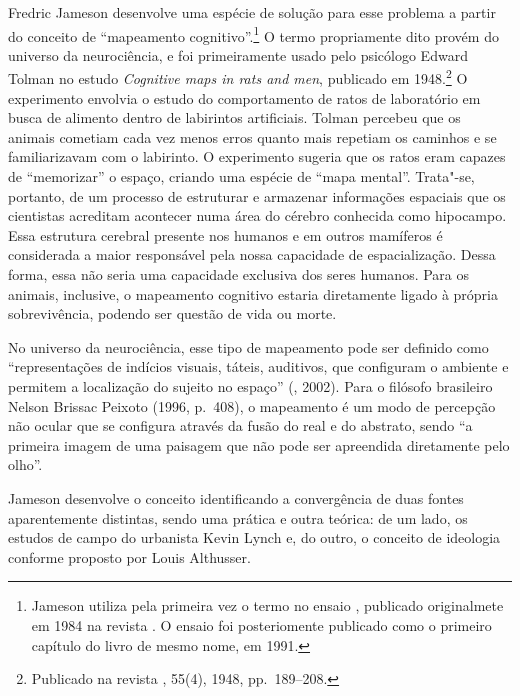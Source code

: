 Fredric Jameson desenvolve uma espécie de solução para esse problema a
partir do conceito de ``mapeamento cognitivo''.\footnote{Jameson utiliza
  pela primeira vez o termo no ensaio {}, publicado originalmete em 1984 na
  revista {}. O ensaio foi posteriomente publicado como o
  primeiro capítulo do livro de mesmo nome, em 1991.} O termo
propriamente dito provém do universo da neurociência, e foi
primeiramente usado pelo psicólogo Edward Tolman no estudo \label{tolman}
\emph{Cognitive maps in rats and men}, publicado em 1948.\footnote{Publicado na
  revista {}, 55(4), 1948, pp.~189--208.} O
experimento envolvia o estudo do comportamento de ratos de laboratório
em busca de alimento dentro de labirintos artificiais. Tolman percebeu
que os animais cometiam cada vez menos erros quanto mais repetiam os
caminhos e se familiarizavam com o labirinto. O experimento sugeria que
os ratos eram capazes de ``memorizar'' o espaço, criando uma espécie de
``mapa mental''. Trata"-se, portanto, de um processo de estruturar e
armazenar informações espaciais que os cientistas acreditam acontecer
numa área do cérebro conhecida como hipocampo. Essa estrutura cerebral
presente nos humanos e em outros mamíferos é considerada a maior
responsável pela nossa capacidade de espacialização. Dessa forma, essa
não seria uma capacidade exclusiva dos seres humanos. Para os animais,
inclusive, o mapeamento cognitivo estaria diretamente ligado à própria
sobrevivência, podendo ser questão de vida ou morte.

No universo da neurociência, esse tipo de mapeamento pode ser definido
como ``representações de indícios visuais, táteis, auditivos, que
configuram o ambiente e permitem a localização do sujeito no espaço''
(, 2002). Para o filósofo brasileiro Nelson Brissac Peixoto (1996, p.~408), o mapeamento é um modo de percepção não ocular que se configura
através da fusão do real e do abstrato, sendo ``a primeira imagem de uma
paisagem que não pode ser apreendida diretamente pelo olho''.

Jameson desenvolve o conceito identificando a convergência de duas
fontes aparentemente distintas, sendo uma prática e outra teórica: de um
lado, os estudos de campo do urbanista Kevin Lynch e, do outro, o
conceito de ideologia conforme proposto por Louis Althusser.

